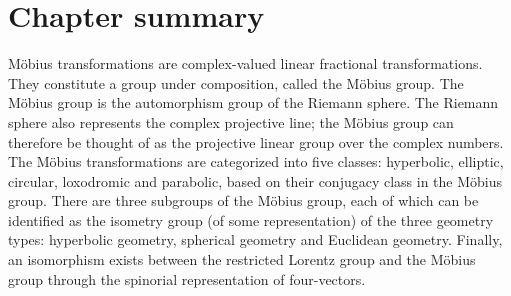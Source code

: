 \section*{Chapter summary}
Möbius transformations are complex-valued linear fractional transformations. They constitute a group under composition, called the Möbius group. The Möbius group is the automorphism group of the Riemann sphere. The Riemann sphere also represents the complex projective line; the Möbius group can therefore be thought of as the projective linear group over the complex numbers. The Möbius transformations are categorized into five classes: hyperbolic, elliptic, circular, loxodromic and parabolic, based on their conjugacy class in the Möbius group. There are three subgroups of the Möbius group, each of which can be identified as the isometry group (of some representation) of the three geometry types: hyperbolic geometry, spherical geometry and Euclidean geometry. Finally, an isomorphism exists between the restricted Lorentz group and the Möbius group through the spinorial representation of four-vectors.
